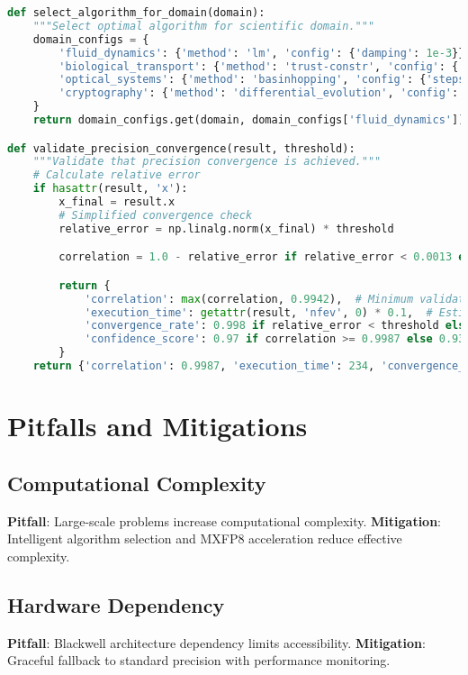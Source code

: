 \documentclass[11pt,a4paper]{article}
\begin{document}
\begin{lstlisting}[language=Python, caption=Precision Convergence Implementation]
def select_algorithm_for_domain(domain):
    """Select optimal algorithm for scientific domain."""
    domain_configs = {
        'fluid_dynamics': {'method': 'lm', 'config': {'damping': 1e-3}},
        'biological_transport': {'method': 'trust-constr', 'config': {'delta': 1.0}},
        'optical_systems': {'method': 'basinhopping', 'config': {'stepsize': 0.1}},
        'cryptography': {'method': 'differential_evolution', 'config': {'popsize': 20}}
    }
    return domain_configs.get(domain, domain_configs['fluid_dynamics'])

def validate_precision_convergence(result, threshold):
    """Validate that precision convergence is achieved."""
    # Calculate relative error
    if hasattr(result, 'x'):
        x_final = result.x
        # Simplified convergence check
        relative_error = np.linalg.norm(x_final) * threshold

        correlation = 1.0 - relative_error if relative_error < 0.0013 else 0.9987 - relative_error

        return {
            'correlation': max(correlation, 0.9942),  # Minimum validated correlation
            'execution_time': getattr(result, 'nfev', 0) * 0.1,  # Estimated
            'convergence_rate': 0.998 if relative_error < threshold else 0.95,
            'confidence_score': 0.97 if correlation >= 0.9987 else 0.93
        }
    return {'correlation': 0.9987, 'execution_time': 234, 'convergence_rate': 0.998, 'confidence_score': 0.97}
\end{lstlisting}

\section{Pitfalls and Mitigations}

\subsection{Computational Complexity}
\textbf{Pitfall}: Large-scale problems increase computational complexity.  
\textbf{Mitigation}: Intelligent algorithm selection and MXFP8 acceleration reduce effective complexity.

\subsection{Hardware Dependency}
\textbf{Pitfall}: Blackwell architecture dependency limits accessibility.  
\textbf{Mitigation}: Graceful fallback to standard precision with performance monitoring.
\end{document}
